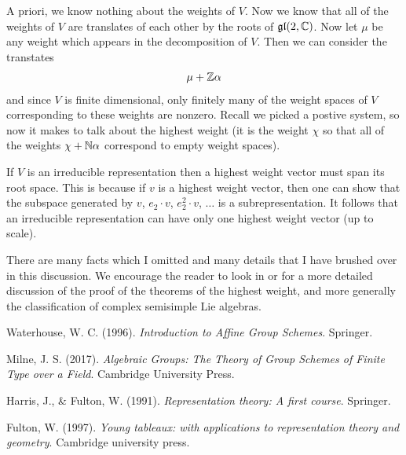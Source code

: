 \documentclass[12pt]{article}
\begin{document}
A priori, we know nothing about the weights of $V$. Now we know that all of the weights of $V$ are translates of each other by the roots of 
$\operatorname{\mathfrak{gl}}(2,\mathbb{C})$. Now let $\mu$ be any weight which appears in the decomposition of $V$. Then we can consider the transtates \begin{align*}
    \mu + \mathbb{Z}\alpha
\end{align*} and since $V$ is finite dimensional, only finitely many of the weight spaces of $V$ corresponding to these weights are nonzero. 
Recall we picked a postive system, so now it makes to talk about the highest weight (it is the weight $\chi$ so that all of the weights $\chi + \mathbb{N}\alpha$ 
correspond to empty weight spaces).

\hfill

If $V$ is an irreducible representation then a highest weight vector must span its root space. This is because
if $v$ is a highest weight vector, then one can show that the subspace generated by $v$, $e_2\cdot v$, $e_2^2\cdot v$, $\ldots$ is a subrepresentation.
It follows that an irreducible representation can have only one highest weight vector (up to scale).

\hfill

There are many facts which I omitted and many details that I have brushed over in this discussion. We encourage
the reader to look in \cite{fulton-harris} or \cite{fulton} for a more detailed discussion of the proof of the theorems of the highest weight, 
and more generally the classification of complex semisimple Lie algebras.


\begin{thebibliography}{9}

Waterhouse, W. C. (1996). \textit{Introduction to Affine Group Schemes}. Springer.

Milne, J. S. (2017). \textit{Algebraic Groups: The Theory of Group Schemes of Finite Type over a Field}. Cambridge University Press.


Harris, J., \& Fulton, W. (1991). \textit{Representation theory: A first course}. Springer.

Fulton, W. (1997). \textit{Young tableaux: with applications to representation theory and geometry}. Cambridge university press.

\end{thebibliography}
\end{document}
